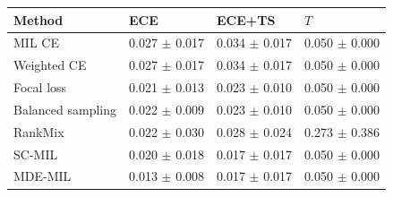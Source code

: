 \begin{tabular}{llll}
\toprule
Method & ECE & ECE+TS & $T$\\
\midrule
MIL CE & \num{0.027} $\pm$ \num{0.017} & \num{0.034} $\pm$ \num{0.017} & \num{0.050} $\pm$ \num{0.000}\\
Weighted CE & \num{0.027} $\pm$ \num{0.017} & \num{0.034} $\pm$ \num{0.017} & \num{0.050} $\pm$ \num{0.000}\\
Focal loss & \num{0.021} $\pm$ \num{0.013} & \num{0.023} $\pm$ \num{0.010} & \num{0.050} $\pm$ \num{0.000}\\
Balanced sampling & \num{0.022} $\pm$ \num{0.009} & \num{0.023} $\pm$ \num{0.010} & \num{0.050} $\pm$ \num{0.000}\\
RankMix & \num{0.022} $\pm$ \num{0.030} & \num{0.028} $\pm$ \num{0.024} & \num{0.273} $\pm$ \num{0.386}\\
SC-MIL & \num{0.020} $\pm$ \num{0.018} & \num{0.017} $\pm$ \num{0.017} & \num{0.050} $\pm$ \num{0.000}\\
MDE-MIL & \num{0.013} $\pm$ \num{0.008} & \num{0.017} $\pm$ \num{0.017} & \num{0.050} $\pm$ \num{0.000}\\
\bottomrule
\end{tabular}

